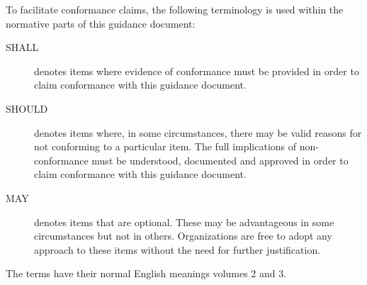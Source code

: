 To facilitate conformance claims, the following terminology is used within the normative parts of this guidance document:
\begin{description}
	\item[SHALL] denotes items where evidence of conformance must be provided in order to claim conformance with this guidance document.
	\item[SHOULD] denotes items where, in some circumstances, there may be valid reasons for not conforming to a particular item. The full implications of non-conformance must be understood, documented and approved in order to claim conformance with this guidance document.
	\item[MAY] denotes items that are optional. These may be advantageous in some circumstances but not in others. Organizations are free to adopt any approach to these items without the need for further justification.
\end{description}

The terms have their normal English meanings volumes 2 and 3.
